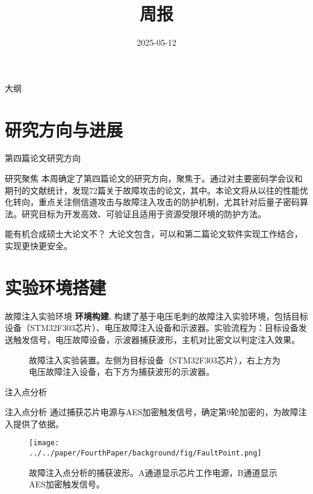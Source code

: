 \documentclass{beamer}
\title{\LARGE{周报}}
\subtitle{}
\author{}
\date{2025-05-12}
\begin{document}
\begin{frame}
  \titlepage
\end{frame}

\begin{frame}{大纲}
  \tableofcontents
\end{frame}


\section{研究方向与进展}
\begin{frame}{第四篇论文研究方向}
  \begin{block}{研究聚焦}
    本周确定了第四篇论文的研究方向，聚焦于。通过对主要密码学会议和期刊的文献统计，发现72篇关于故障攻击的论文，其中。本论文将从以往的性能优化转向，重点关注侧信道攻击与故障注入攻击的防护机制，尤其针对后量子密码算法。研究目标为开发高效、可验证且适用于资源受限环境的防护方法。
  \end{block}
   \begin{alertblock}{能有机合成硕士大论文不？}
    大论文包含，可以和第二篇论文软件实现工作结合，实现更快更安全。
  \end{alertblock}
\end{frame}

\section{实验环境搭建}
\begin{frame}{故障注入实验环境}
  \textbf{环境构建.} 构建了基于电压毛刺的故障注入实验环境，包括目标设备（STM32F303芯片）、电压故障注入设备和示波器。实验流程为：目标设备发送触发信号，电压故障设备，示波器捕获波形，主机对比密文以判定注入效果。

  \begin{figure}
    \centering
    \caption{故障注入实验装置。左侧为目标设备（STM32F303芯片），右上方为电压故障注入设备，右下方为捕获波形的示波器。}
  \end{figure}
\end{frame}

\begin{frame}{注入点分析}
  \begin{block}{注入点分析}
    通过捕获芯片电源与AES加密触发信号，确定第9轮加密的，为故障注入提供了依据。
  \end{block}
  \begin{figure}
    \centering
    \texttt{[image: ../../paper/FourthPaper/background/fig/FaultPoint.png]}
    \caption{故障注入点分析的捕获波形。A通道显示芯片工作电源，B通道显示AES加密触发信号。}
  \end{figure}
\end{frame}
\end{document}
